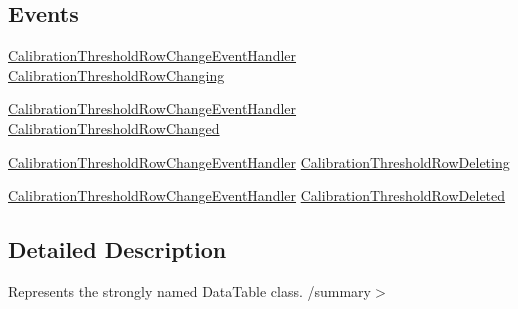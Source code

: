 \subsection*{Events}
\begin{DoxyCompactItemize}
\item 
\hyperlink{class_env_int_1_1_win32_1_1_field_tech_1_1_manager_1_1_data_sets_1_1_guide_ware_mobile_data_set_a2a61338e8d68c897b004fe6fa4479d4e}{Calibration\+Threshold\+Row\+Change\+Event\+Handler} \hyperlink{class_env_int_1_1_win32_1_1_field_tech_1_1_manager_1_1_data_sets_1_1_guide_ware_mobile_data_set_e4a98fb4b531becb042ae997c9d8a15c_a9654f5ad65e48ee067e11ce032aa01c7}{Calibration\+Threshold\+Row\+Changing}
\item 
\hyperlink{class_env_int_1_1_win32_1_1_field_tech_1_1_manager_1_1_data_sets_1_1_guide_ware_mobile_data_set_a2a61338e8d68c897b004fe6fa4479d4e}{Calibration\+Threshold\+Row\+Change\+Event\+Handler} \hyperlink{class_env_int_1_1_win32_1_1_field_tech_1_1_manager_1_1_data_sets_1_1_guide_ware_mobile_data_set_e4a98fb4b531becb042ae997c9d8a15c_ad8a99bb464f0b92c762714b7cec9a372}{Calibration\+Threshold\+Row\+Changed}
\item 
\hyperlink{class_env_int_1_1_win32_1_1_field_tech_1_1_manager_1_1_data_sets_1_1_guide_ware_mobile_data_set_a2a61338e8d68c897b004fe6fa4479d4e}{Calibration\+Threshold\+Row\+Change\+Event\+Handler} \hyperlink{class_env_int_1_1_win32_1_1_field_tech_1_1_manager_1_1_data_sets_1_1_guide_ware_mobile_data_set_e4a98fb4b531becb042ae997c9d8a15c_a7a883e776cceb11455eee49d9571d9aa}{Calibration\+Threshold\+Row\+Deleting}
\item 
\hyperlink{class_env_int_1_1_win32_1_1_field_tech_1_1_manager_1_1_data_sets_1_1_guide_ware_mobile_data_set_a2a61338e8d68c897b004fe6fa4479d4e}{Calibration\+Threshold\+Row\+Change\+Event\+Handler} \hyperlink{class_env_int_1_1_win32_1_1_field_tech_1_1_manager_1_1_data_sets_1_1_guide_ware_mobile_data_set_e4a98fb4b531becb042ae997c9d8a15c_a3aa123b61018274d5f78de573cce84a3}{Calibration\+Threshold\+Row\+Deleted}
\end{DoxyCompactItemize}


\subsection{Detailed Description}
Represents the strongly named Data\+Table class. /summary$>$ 

